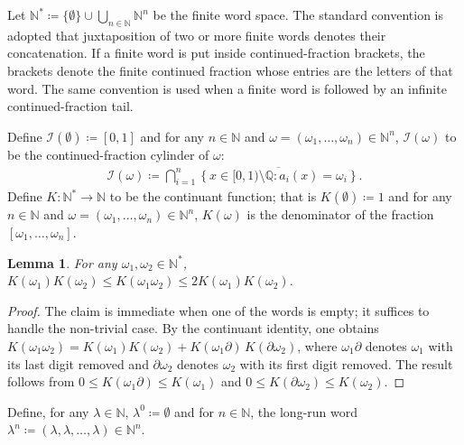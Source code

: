 \documentclass[12pt,reqno]{amsart}
\theoremstyle{definition}
\theoremstyle{plain}
\newtheorem{lemma}{Lemma}
\begin{document}
Let $\mathbb{N}^*\coloneqq\{\emptyset\}\cup\bigcup_{n\in\mathbb{N}}\mathbb{N}^n$ be the finite word space. The standard convention is adopted that juxtaposition of two or more finite words denotes their concatenation. If a finite word is put inside continued-fraction brackets, the brackets denote the finite continued fraction whose entries are the letters of that word. The same convention is used when a finite word is followed by an infinite continued-fraction tail.

Define $\mathcal{I}(\emptyset)\coloneqq[0,1]$ and for any $n\in\mathbb{N}$ and $\omega=(\omega_1,\dots,\omega_n)\in\mathbb{N}^n$, $\mathcal{I}(\omega)$ to be the continued-fraction cylinder of $\omega$:
\begin{align*}
    \mathcal{I}(\omega)
    \coloneqq
    \bigcap_{i=1}^n\overline{\left\{x\in[0,1)\setminus\mathbb{Q}:
    a_i(x)=\omega_i\right\}}.
\end{align*}
Define $K:\mathbb{N}^*\to\mathbb{N}$ to be the continuant function; that is $K(\emptyset)\coloneqq1$ and for any $n\in\mathbb{N}$ and $\omega=(\omega_1,\dots,\omega_n)\in\mathbb{N}^n$, $K(\omega)$ is the denominator of the fraction $[\omega_1,\ldots,\omega_n]$.

\begin{lemma}
\label{lem:continuant-concatenation}
For any $\omega_1,\omega_2\in\mathbb{N}^*$, $K(\omega_1)K(\omega_2)\leq K(\omega_1\omega_2)\leq 2K(\omega_1)K(\omega_2)$.
\end{lemma}
\begin{proof}
The claim is immediate when one of the words is empty; it suffices to handle the non-trivial case. By the continuant identity, one obtains $K(\omega_1\omega_2)=K(\omega_1)K(\omega_2)+K({\omega_{1}}\partial)\,K(\partial\omega_2)$,
where ${\omega_1}\partial$ denotes $\omega_1$ with its last digit removed and $\partial\omega_2$ denotes $\omega_2$ with its first digit removed. The result follows from $0\leq K({\omega_1}\partial)\leq K(\omega_1)$ and $0\leq K(\partial\omega_2)\leq K(\omega_2)$.
\end{proof}

Define, for any $\lambda\in\mathbb{N}$, $\lambda^0\coloneqq\emptyset$ and for $n\in\mathbb{N}$, the long-run word $\lambda^n\coloneqq(\lambda,\lambda,\ldots,\lambda)\in\mathbb{N}^n$.
\end{document}
